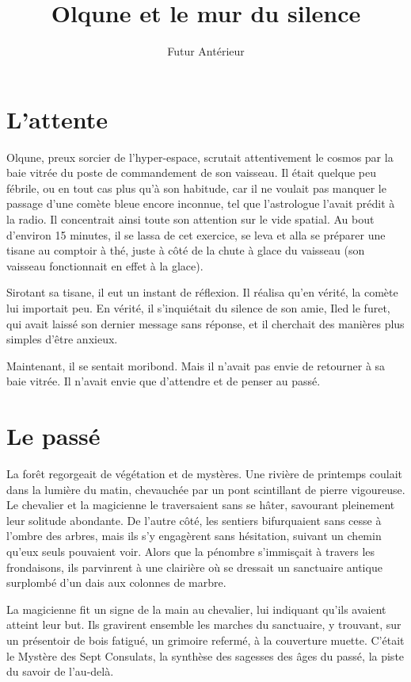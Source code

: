 \documentclass[a4paper,11pt, openany]{book}
\title{Olqune et le mur du silence}
\author{Futur Antérieur}
\begin{document}
\maketitle

\chapter{L'attente}
Olqune, preux sorcier de l'hyper-espace, scrutait attentivement le cosmos par la baie vitrée du poste de commandement de son vaisseau.
Il était quelque peu fébrile, ou en tout cas plus qu'à son habitude, car il ne voulait pas manquer le passage d'une comète bleue encore inconnue, tel que l'astrologue l'avait prédit à la radio.
Il concentrait ainsi toute son attention sur le vide spatial. Au bout d'environ 15 minutes, il se lassa de cet exercice, se leva 
et alla se préparer une tisane au comptoir à thé, juste à côté de la chute à glace du vaisseau (son vaisseau fonctionnait en effet à la glace).

Sirotant sa tisane, il eut un instant de réflexion. Il réalisa qu'en vérité, la comète lui importait peu.
En vérité, il s'inquiétait du silence de son amie, Iled le furet, qui avait laissé son dernier message sans réponse, et il cherchait des manières plus simples d'être anxieux.

Maintenant, il se sentait moribond. Mais il n'avait pas envie de retourner à sa baie vitrée. Il n'avait envie que d'attendre et de penser au passé.

\chapter{Le passé}
La forêt regorgeait de végétation et de mystères. Une rivière de printemps coulait dans la lumière du matin, chevauchée par un pont scintillant de pierre vigoureuse.
Le chevalier et la magicienne le traversaient sans se hâter, savourant pleinement leur solitude abondante. 
De l'autre côté, les sentiers bifurquaient sans cesse à l'ombre des arbres, mais ils s'y engagèrent sans hésitation, suivant un chemin qu'eux seuls pouvaient voir.
Alors que la pénombre s'immisçait à travers les frondaisons, ils parvinrent à une clairière où se dressait un sanctuaire antique surplombé d'un dais aux colonnes de marbre. 

La magicienne fit un signe de la main au chevalier, lui indiquant qu'ils avaient atteint leur but. 
Ils gravirent ensemble les marches du sanctuaire, y trouvant, sur un présentoir de bois fatigué, un grimoire refermé, à la couverture muette.
C'était le Mystère des Sept Consulats, la synthèse des sagesses des âges du passé, la piste du savoir de l'au-delà.
\end{document}
